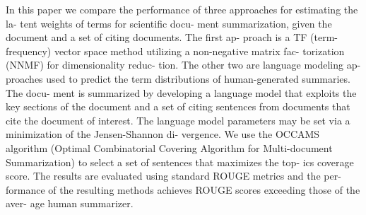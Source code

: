 In this paper we compare the performance of three approaches for estimating the la- tent weights of terms for scientific docu- ment summarization, given the document and a set of citing documents. The first ap- proach is a TF (term-frequency) vector space method utilizing a non-negative matrix fac- torization (NNMF) for dimensionality reduc- tion. The other two are language modeling ap- proaches used to predict the term distributions of human-generated summaries. The docu- ment is summarized by developing a language model that exploits the key sections of the document and a set of citing sentences from documents that cite the document of interest. The language model parameters may be set via a minimization of the Jensen-Shannon di- vergence. We use the OCCAMS algorithm (Optimal Combinatorial Covering Algorithm for Multi-document Summarization) to select a set of sentences that maximizes the top- ics coverage score. The results are evaluated using standard ROUGE metrics and the per- formance of the resulting methods achieves ROUGE scores exceeding those of the aver- age human summarizer.
